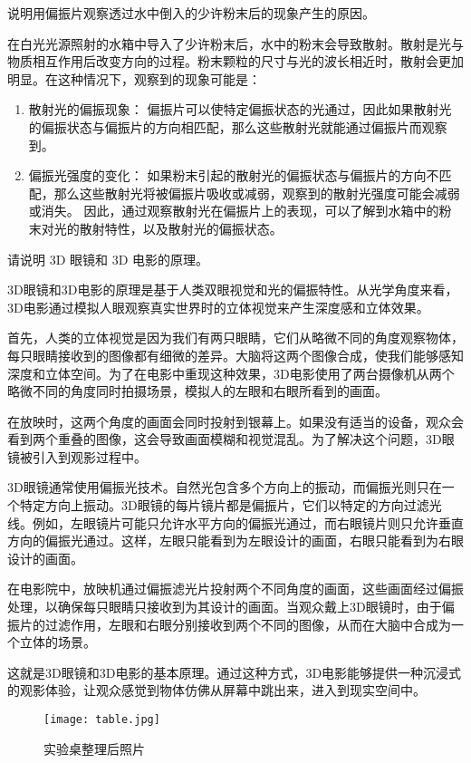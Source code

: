 \documentclass[dvipsnames, svgnames,a4paper,11pt]{article}
\begin{document}
\begin{question}
	说明用偏振片观察透过水中倒入的少许粉末后的现象产生的原因。
\end{question}
	


在白光光源照射的水箱中导入了少许粉末后，水中的粉末会导致散射。散射是光与物质相互作用后改变方向的过程。粉末颗粒的尺寸与光的波长相近时，散射会更加明显。在这种情况下，观察到的现象可能是：

	\begin{enumerate}
		\item 散射光的偏振现象： 偏振片可以使特定偏振状态的光通过，因此如果散射光的偏振状态与偏振片的方向相匹配，那么这些散射光就能通过偏振片而观察到。
		\item 偏振光强度的变化： 如果粉末引起的散射光的偏振状态与偏振片的方向不匹配，那么这些散射光将被偏振片吸收或减弱，观察到的散射光强度可能会减弱或消失。
		因此，通过观察散射光在偏振片上的表现，可以了解到水箱中的粉末对光的散射特性，以及散射光的偏振状态。
	\end{enumerate}






\begin{question}
	请说明 3D 眼镜和 3D 电影的原理。
\end{question}


3D眼镜和3D电影的原理是基于人类双眼视觉和光的偏振特性。从光学角度来看，3D电影通过模拟人眼观察真实世界时的立体视觉来产生深度感和立体效果。

首先，人类的立体视觉是因为我们有两只眼睛，它们从略微不同的角度观察物体，每只眼睛接收到的图像都有细微的差异。大脑将这两个图像合成，使我们能够感知深度和立体空间。为了在电影中重现这种效果，3D电影使用了两台摄像机从两个略微不同的角度同时拍摄场景，模拟人的左眼和右眼所看到的画面。

在放映时，这两个角度的画面会同时投射到银幕上。如果没有适当的设备，观众会看到两个重叠的图像，这会导致画面模糊和视觉混乱。为了解决这个问题，3D眼镜被引入到观影过程中。

3D眼镜通常使用偏振光技术。自然光包含多个方向上的振动，而偏振光则只在一个特定方向上振动。3D眼镜的每片镜片都是偏振片，它们以特定的方向过滤光线。例如，左眼镜片可能只允许水平方向的偏振光通过，而右眼镜片则只允许垂直方向的偏振光通过。这样，左眼只能看到为左眼设计的画面，右眼只能看到为右眼设计的画面。

在电影院中，放映机通过偏振滤光片投射两个不同角度的画面，这些画面经过偏振处理，以确保每只眼睛只接收到为其设计的画面。当观众戴上3D眼镜时，由于偏振片的过滤作用，左眼和右眼分别接收到两个不同的图像，从而在大脑中合成为一个立体的场景。

这就是3D眼镜和3D电影的基本原理。通过这种方式，3D电影能够提供一种沉浸式的观影体验，让观众感觉到物体仿佛从屏幕中跳出来，进入到现实空间中。



\begin{figure}[H]
	\centering
	\texttt{[image: table.jpg]}
	\caption{实验桌整理后照片}
\end{figure}
	
\end{document}
